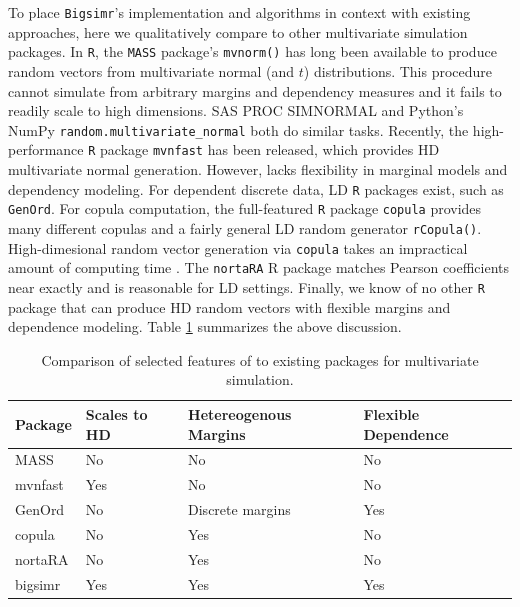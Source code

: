 \documentclass[
]{jss}
\begin{document}
To place \texttt{Bigsimr}'s implementation and algorithms in context with existing approaches, here we qualitatively compare to other multivariate simulation packages. In \texttt{R}, the \texttt{MASS} package's \texttt{mvnorm()} has long been available to produce random vectors from multivariate normal (and \(t\)) distributions. This procedure cannot simulate from arbitrary margins and dependency measures and it fails to readily scale to high dimensions. SAS PROC SIMNORMAL and Python's NumPy \texttt{random.multivariate\_normal} both do similar tasks. Recently, the high-performance \texttt{R} package \texttt{mvnfast} \citep{Fasiolo2016} has been released, which provides HD multivariate normal generation. However, lacks flexibility in marginal models and dependency modeling. For dependent discrete data, LD \texttt{R} packages exist, such as \texttt{GenOrd}. For copula computation, the full-featured \texttt{R} package \texttt{copula} provides many different copulas and a fairly general LD random generator \texttt{rCopula()}. High-dimesional random vector generation via \texttt{copula} takes an impractical amount of computing time \citep{Li2019gpu}. The \texttt{nortaRA} R package matches Pearson coefficients near exactly and is reasonable for LD settings. Finally, we know of no other \texttt{R} package that can produce HD random vectors with flexible margins and dependence modeling. Table \ref{tab:compare-table} summarizes the above discussion.

\begin{table}[h]
\centering
\caption{\label{tab:compare-table}Comparison of selected features of  to existing packages for multivariate simulation.}
\begin{tabular}{@{}llll@{}}
Package & Scales to HD & Hetereogenous Margins & Flexible Dependence \\ \midrule
MASS      & No           & No                    & No                  \\
mvnfast   & Yes          & No                    & No                  \\
GenOrd    & No           & Discrete margins      & Yes                 \\
copula    & No           & Yes                   & No                  \\
nortaRA   & No           & Yes                   & No                  \\
bigsimr   & Yes          & Yes                   & Yes                
\end{tabular}
\end{table}
\end{document}
